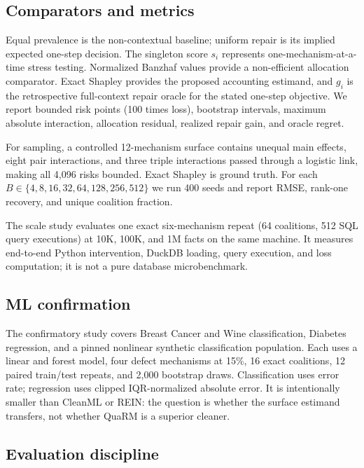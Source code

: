 \documentclass[conference]{IEEEtran}
\newcommand{\method}{QuaRM}
\begin{document}
\subsection{Comparators and metrics}

Equal prevalence is the non-contextual baseline; uniform repair is its implied expected one-step decision. The singleton score $s_i$ represents one-mechanism-at-a-time stress testing. Normalized Banzhaf values provide a non-efficient allocation comparator. Exact Shapley provides the proposed accounting estimand, and $g_i$ is the retrospective full-context repair oracle for the stated one-step objective. We report bounded risk points (100 times loss), bootstrap intervals, maximum absolute interaction, allocation residual, realized repair gain, and oracle regret.

For sampling, a controlled 12-mechanism surface contains unequal main effects, eight pair interactions, and three triple interactions passed through a logistic link, making all 4,096 risks bounded. Exact Shapley is ground truth. For each $B\in\{4,8,16,32,64,128,256,512\}$ we run 400 seeds and report RMSE, rank-one recovery, and unique coalition fraction.

The scale study evaluates one exact six-mechanism repeat (64 coalitions, 512 SQL query executions) at 10K, 100K, and 1M facts on the same machine. It measures end-to-end Python intervention, DuckDB loading, query execution, and loss computation; it is not a pure database microbenchmark.

\subsection{ML confirmation}

The confirmatory study covers Breast Cancer and Wine classification, Diabetes regression, and a pinned nonlinear synthetic classification population. Each uses a linear and forest model, four defect mechanisms at 15\%, 16 exact coalitions, 12 paired train/test repeats, and 2,000 bootstrap draws. Classification uses error rate; regression uses clipped IQR-normalized absolute error. It is intentionally smaller than CleanML or REIN: the question is whether the surface estimand transfers, not whether \method{} is a superior cleaner.

\subsection{Evaluation discipline}
\end{document}
